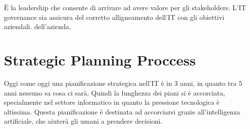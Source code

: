 È la leadership che consente di arrivare ad avere valore per gli stakeholders.
L'IT governance sia assicura del corretto alligneamento dell'IT con gli 
obiettivi aziendali. dell'azienda.



\section{Strategic Planning Proccess}
\label{PG:SPP}

Oggi come oggi una pianificazione strategica nell'IT è in 3 anni, in quanto tra 
5 anni nessuno sa cosa ci sarà. Quindi la lunghezza dei piani si è accorciata, 
specialmente nel settore informatico in quanto la pressione tecnologica è 
altissima. Questa pianificazione è destinata ad accorciarsi grazie 
all'intelligenza artificiale, che aiuterà gli umani a prendere decisioni.
